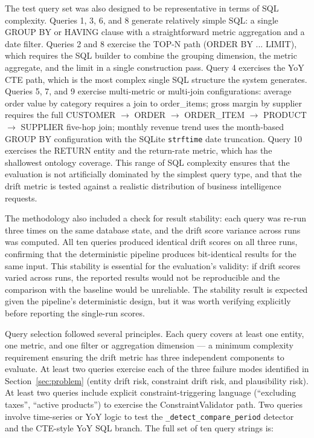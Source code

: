\documentclass[12pt,a4paper]{report}
\begin{document}
The test query set was also designed to be representative in terms of SQL complexity. Queries 1, 3, 6, and 8 generate relatively simple SQL: a single GROUP BY or HAVING clause with a straightforward metric aggregation and a date filter. Queries 2 and 8 exercise the TOP-N path (ORDER BY ... LIMIT), which requires the SQL builder to combine the grouping dimension, the metric aggregate, and the limit in a single construction pass. Query 4 exercises the YoY CTE path, which is the most complex single SQL structure the system generates. Queries 5, 7, and 9 exercise multi-metric or multi-join configurations: average order value by category requires a join to order\_items; gross margin by supplier requires the full CUSTOMER $\to$ ORDER $\to$ ORDER\_ITEM $\to$ PRODUCT $\to$ SUPPLIER five-hop join; monthly revenue trend uses the month-based GROUP BY configuration with the SQLite \texttt{strftime} date truncation. Query 10 exercises the RETURN entity and the return-rate metric, which has the shallowest ontology coverage. This range of SQL complexity ensures that the evaluation is not artificially dominated by the simplest query type, and that the drift metric is tested against a realistic distribution of business intelligence requests.

The methodology also included a check for result stability: each query was re-run three times on the same database state, and the drift score variance across runs was computed. All ten queries produced identical drift scores on all three runs, confirming that the deterministic pipeline produces bit-identical results for the same input. This stability is essential for the evaluation's validity: if drift scores varied across runs, the reported results would not be reproducible and the comparison with the baseline would be unreliable. The stability result is expected given the pipeline's deterministic design, but it was worth verifying explicitly before reporting the single-run scores.

Query selection followed several principles. Each query covers at least one entity, one metric, and one filter or aggregation dimension — a minimum complexity requirement ensuring the drift metric has three independent components to evaluate. At least two queries exercise each of the three failure modes identified in Section~\ref{sec:problem} (entity drift risk, constraint drift risk, and plausibility risk). At least two queries include explicit constraint-triggering language (``excluding taxes'', ``active products'') to exercise the ConstraintValidator path. Two queries involve time-series or YoY logic to test the \texttt{\_detect\_compare\_period} detector and the CTE-style YoY SQL branch. The full set of ten query strings is:
\end{document}
